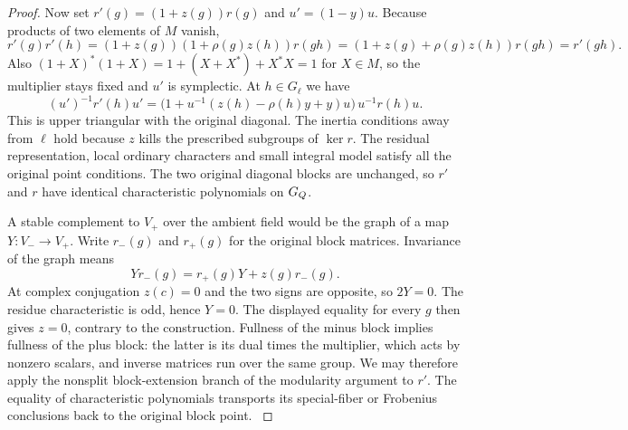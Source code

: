 \begin{proof}
Now set \(r'(g)=(1+z(g))r(g)\) and \(u'=(1-y)u\).
Because products of two elements of \(M\) vanish,
\[
 r'(g)r'(h)
  =(1+z(g))(1+\rho(g)z(h))r(gh)
  =(1+z(g)+\rho(g)z(h))r(gh)
  =r'(gh).
\]
Also \((1+X)^*(1+X)=1+(X+X^*)+X^*X=1\) for \(X\in M\), so
the multiplier stays fixed and \(u'\) is symplectic. At \(h\in
G_\ell\) we have
\[
 (u')^{-1}r'(h)u'=
 \bigl(1+u^{-1}(z(h)-\rho(h)y+y)u\bigr)\,u^{-1}r(h)u.
\]
This is upper triangular with the original diagonal. The inertia
conditions away from \(\ell\) hold because \(z\) kills the prescribed
subgroups of \(\ker r\). The residual representation, local ordinary
characters and small integral model satisfy all the original
point conditions. The two original diagonal blocks are unchanged,
so \(r'\) and \(r\) have identical characteristic polynomials
on \(G_Q\).

A stable complement to \(V_+\) over the ambient field would be
the graph of a map \(Y:V_-\to V_+\). Write \(r_-(g)\) and
\(r_+(g)\) for the original block matrices. Invariance of
the graph means
\[
        Y r_-(g)=r_+(g)Y+z(g)r_-(g).
\]
At complex conjugation \(z(c)=0\) and the two signs are opposite,
so \(2Y=0\). The residue characteristic is odd, hence \(Y=0\).
The displayed equality for every \(g\) then gives \(z=0\),
contrary to the construction.
Fullness of the minus block implies fullness of the plus block:
the latter is its dual times the multiplier, which acts by
nonzero scalars, and inverse matrices run over the same group.
We may therefore apply the nonsplit block-extension branch of the
modularity argument to \(r'\). The equality of characteristic
polynomials transports its special-fiber or Frobenius conclusions
back to the original block point. \label{cor:cohomology-full-block-extension-1}
\end{proof}
